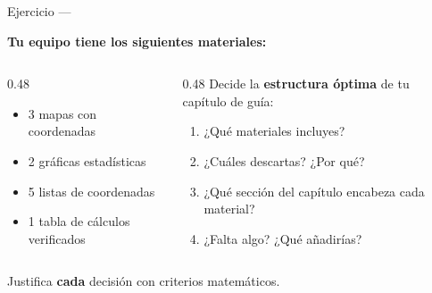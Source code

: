 \documentclass[aspectratio=169, 10pt, spanish]{beamer}
\begin{document}
\begin{frame}{Ejercicio — }
  \begin{evaluarbox}
    \textbf{Tu equipo tiene los siguientes materiales:}
    \begin{columns}[t]
      \begin{column}{0.48\textwidth}
        \begin{itemize}
          \item 3 mapas con coordenadas
          \item 2 gráficas estadísticas
          \item 5 listas de coordenadas
          \item 1 tabla de cálculos verificados
        \end{itemize}
      \end{column}
      \begin{column}{0.48\textwidth}
        Decide la \textbf{estructura óptima} de tu capítulo de guía:
        \begin{enumerate}
          \item ¿Qué materiales incluyes?
          \item ¿Cuáles descartas? ¿Por qué?
          \item ¿Qué sección del capítulo encabeza cada material?
          \item ¿Falta algo? ¿Qué añadirías?
        \end{enumerate}
      \end{column}
    \end{columns}
    \vspace{0.2cm}
    Justifica \textbf{cada} decisión con criterios matemáticos.
  \end{evaluarbox}
\end{frame}
\end{document}
